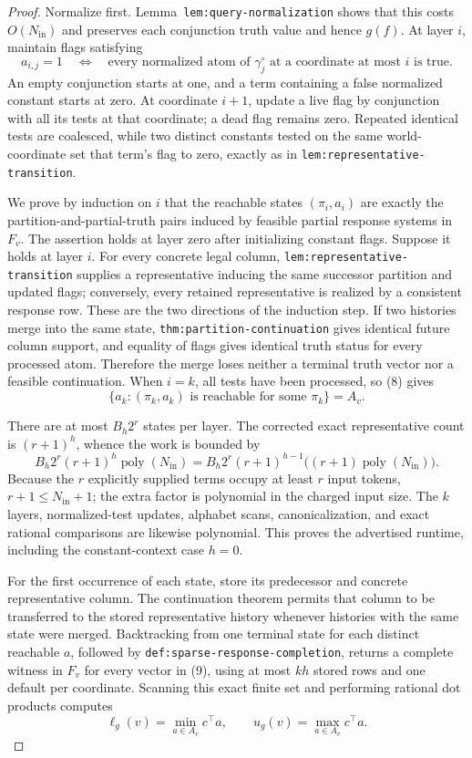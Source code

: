 \documentclass{article}
\begin{document}
\begin{proof}
Normalize first. Lemma~\texttt{lem:query-normalization} shows that this costs \(O(N_{\mathrm{in}})\) and preserves each conjunction truth value and hence \(g(f)\). At layer \(i\), maintain flags satisfying
\[
 a_{i,j}=1
 \quad\Longleftrightarrow\quad
 \text{every normalized atom of \(\gamma_j^{\circ}\) at a coordinate at most \(i\) is true}.
 \tag{8}
\]
An empty conjunction starts at one, and a term containing a false normalized constant starts at zero. At coordinate \(i+1\), update a live flag by conjunction with all its tests at that coordinate; a dead flag remains zero. Repeated identical tests are coalesced, while two distinct constants tested on the same world-coordinate set that term's flag to zero, exactly as in \texttt{lem:representative-transition}.

We prove by induction on \(i\) that the reachable states \((\pi_i,a_i)\) are exactly the partition-and-partial-truth pairs induced by feasible partial response systems in \(F_v\). The assertion holds at layer zero after initializing constant flags. Suppose it holds at layer \(i\). For every concrete legal column, \texttt{lem:representative-transition} supplies a representative inducing the same successor partition and updated flags; conversely, every retained representative is realized by a consistent response row. These are the two directions of the induction step. If two histories merge into the same state, \texttt{thm:partition-continuation} gives identical future column support, and equality of flags gives identical truth status for every processed atom. Therefore the merge loses neither a terminal truth vector nor a feasible continuation. When \(i=k\), all tests have been processed, so (8) gives
\[
 \{a_k:(\pi_k,a_k)\text{ is reachable for some }\pi_k\}=A_v.
 \tag{9}
\]

There are at most \(B_h2^r\) states per layer. The corrected exact representative count is \((r+1)^h\), whence the work is bounded by
\[
 B_h2^r(r+1)^h\operatorname{poly}(N_{\mathrm{in}})
 =B_h2^r(r+1)^{h-1}\bigl((r+1)\operatorname{poly}(N_{\mathrm{in}})\bigr).
\]
Because the \(r\) explicitly supplied terms occupy at least \(r\) input tokens, \(r+1\leq N_{\mathrm{in}}+1\); the extra factor is polynomial in the charged input size. The \(k\) layers, normalized-test updates, alphabet scans, canonicalization, and exact rational comparisons are likewise polynomial. This proves the advertised runtime, including the constant-context case \(h=0\).

For the first occurrence of each state, store its predecessor and concrete representative column. The continuation theorem permits that column to be transferred to the stored representative history whenever histories with the same state were merged. Backtracking from one terminal state for each distinct reachable \(a\), followed by \texttt{def:sparse-response-completion}, returns a complete witness in \(F_v\) for every vector in (9), using at most \(kh\) stored rows and one default per coordinate. Scanning this exact finite set and performing rational dot products computes
\[
 \ell_g(v)=\min_{a\in A_v}c^\top a,
 \qquad
 u_g(v)=\max_{a\in A_v}c^\top a.
 \tag{10}
\]


\end{proof}
\end{document}
